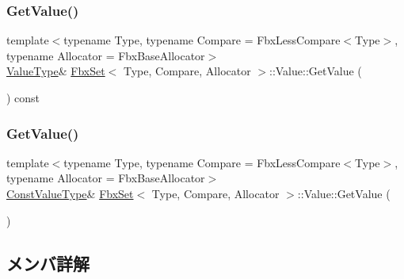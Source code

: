 \mbox{\label{class_fbx_set_1_1_value_a6043b78df834e7911e14e7bcd76889cc}} 
\subsubsection{\texorpdfstring{Get\+Value()}{GetValue()}\hspace{0.1cm}{\footnotesize\ttfamily [1/2]}}
{\footnotesize\ttfamily template$<$typename Type, typename Compare = Fbx\+Less\+Compare$<$\+Type$>$, typename Allocator = Fbx\+Base\+Allocator$>$ \\
\hyperlink{class_fbx_set_1_1_value_aa4757d6676c438c18ab271c57997d8eb}{Value\+Type}\& \hyperlink{class_fbx_set}{Fbx\+Set}$<$ Type, Compare, Allocator $>$\+::Value\+::\+Get\+Value (\begin{DoxyParamCaption}{ }\end{DoxyParamCaption}) const}

\mbox{\label{class_fbx_set_1_1_value_ae91a4001845b34f06c36b1e6fe966bf4}} 
\subsubsection{\texorpdfstring{Get\+Value()}{GetValue()}\hspace{0.1cm}{\footnotesize\ttfamily [2/2]}}
{\footnotesize\ttfamily template$<$typename Type, typename Compare = Fbx\+Less\+Compare$<$\+Type$>$, typename Allocator = Fbx\+Base\+Allocator$>$ \\
\hyperlink{class_fbx_set_1_1_value_a4b01735d9b84587bb21bd4a9d75e419b}{Const\+Value\+Type}\& \hyperlink{class_fbx_set}{Fbx\+Set}$<$ Type, Compare, Allocator $>$\+::Value\+::\+Get\+Value (\begin{DoxyParamCaption}{ }\end{DoxyParamCaption})}



\subsection{メンバ詳解}
\mbox{\label{class_fbx_set_1_1_value_ae8a99bc167579b0edf8e131f4a7731a9}} 
